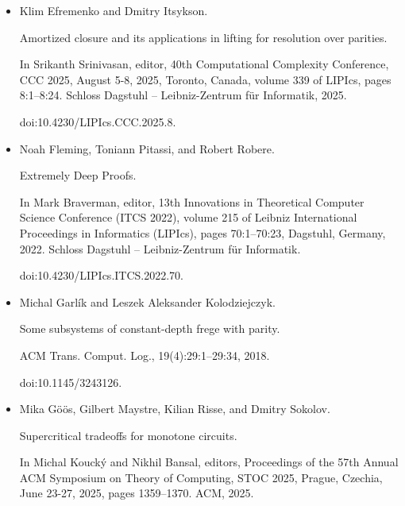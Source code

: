 \documentclass[10pt,a4paper]{article}
\begin{document}
\begin{itemize}
doi:10.1137/24M1696640.





\item 
[18]

Klim Efremenko and Dmitry Itsykson.


Amortized closure and its applications in lifting for resolution over
parities.


In Srikanth Srinivasan, editor, 40th Computational Complexity
Conference, CCC 2025, August 5-8, 2025, Toronto, Canada, volume 339 of
LIPIcs, pages 8:1–8:24. Schloss Dagstuhl – Leibniz-Zentrum für
Informatik, 2025.


doi:10.4230/LIPIcs.CCC.2025.8.





\item 
[19]

Noah Fleming, Toniann Pitassi, and Robert Robere.


Extremely Deep Proofs.


In Mark Braverman, editor, 13th Innovations in Theoretical
Computer Science Conference (ITCS 2022), volume 215 of Leibniz
International Proceedings in Informatics (LIPIcs), pages 70:1–70:23,
Dagstuhl, Germany, 2022. Schloss Dagstuhl – Leibniz-Zentrum für
Informatik.


doi:10.4230/LIPIcs.ITCS.2022.70.





\item 
[20]

Michal Garlík and Leszek Aleksander Kolodziejczyk.


Some subsystems of constant-depth frege with parity.


ACM Trans. Comput. Log., 19(4):29:1–29:34, 2018.


doi:10.1145/3243126.





\item 
[21]

Mika Göös, Gilbert Maystre, Kilian Risse, and Dmitry Sokolov.


Supercritical tradeoffs for monotone circuits.


In Michal Koucký and Nikhil Bansal, editors, Proceedings
of the 57th Annual ACM Symposium on Theory of Computing, STOC 2025,
Prague, Czechia, June 23-27, 2025, pages 1359–1370. ACM, 2025.



\end{itemize}
\end{document}
